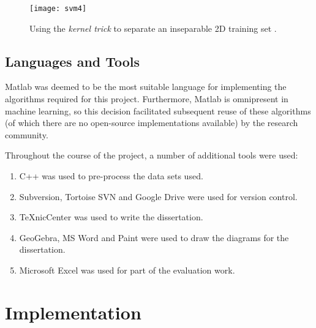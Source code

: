 \documentclass[12pt,twoside,notitlepage,amsart]{report} %
\begin{document}
	\begin{figure} [h]
	\texttt{[image: svm4]}
	\caption{\small{Using the \emph{kernel trick} to separate an inseparable 2D training set \cite{Bishop06}. }}%
	\label{}%
	\end{figure}
%	
%	
%	
%	
%	
%	
%	
%	
	
	
	\section{Languages and Tools}
	
	Matlab was deemed to be the most suitable language for implementing the algorithms required for this project. Furthermore, Matlab is omnipresent in machine learning, so this decision facilitated subsequent reuse of these algorithms (of which there are no open-source implementations available) by the research community. 
	
	Throughout the course of the project, a number of additional tools were used:
	
	\begin{enumerate}
	
	\item C++ was used to pre-process the data sets used. 
	\item Subversion, Tortoise SVN and Google Drive were used for version control.
	\item TeXnicCenter was used to write the dissertation. 
	\item GeoGebra, MS Word and Paint were used to draw the diagrams for the dissertation. 
	\item Microsoft Excel was used for part of the evaluation work. 
	
	\end{enumerate}
	
\cleardoublepage	
	
	
	\chapter{Implementation} %
	
\end{document}
